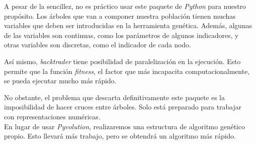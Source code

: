     A pesar de la sencillez, no es pr\'actico usar este paquete de \textit{Python} para nuestro prop\'osito. Los \'arboles que van a componer nuestra poblaci\'on tienen muchas variables que deben ser introducidas en la herramienta gen\'etica. Adem\'as, algunas de las variables son continuas, como los par\'ametros de algunos indicadores, y otras variables son discretas, como el indicador de cada nodo.
    
    As\'i mismo, \textit{backtrader} tiene posibilidad de paralelizaci\'on en la ejecuci\'on. Esto permite que la funci\'on \textit{fitness}, el factor que m\'as incapacita computacionalmente, se pueda ejecutar mucho m\'as r\'apido.
    
    No obstante, el problema que descarta definitivamente este paquete es la imposibilidad de hacer cruces entre \'arboles. Solo est\'a preparado para trabajar con representaciones num\'ericas.\\
    
    
    En lugar de usar \textit{Pyvolution}, realizaremos una estructura de algoritmo gen\'etico propio. Esto llevar\'a m\'as trabajo, pero se obtendr\'a un algoritmo m\'as r\'apido.